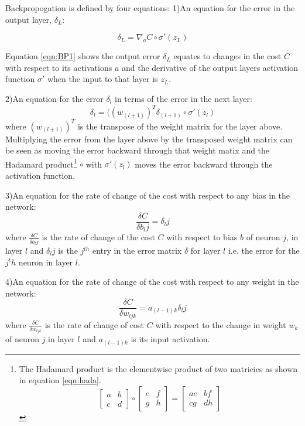 Backpropogation is defined by four equations:
1)An equation for the error in the output layer, $\delta_L$:

\begin{equation}
\delta_L = \nabla_a C \circ \sigma'(z_L)
\label{eqn:BP1}
\end{equation}

Equation \ref{eqn:BP1} shows the output error $\delta_L$ equates to changes in the cost $C$ with respect to its activations $a$ and the derivative of the output layers activation function $\sigma'$ when the input to that layer is $z_L$.

2)An equation for the error $\delta_l$ in terms of the error in the next layer:
\begin{equation}
\delta_l = ((w_{(l+1)})^T\delta_{(l+1)} \circ \sigma'(z_l)
\label{eqn:BP2}
\end{equation}
where $(w_{(l+1)})^T$ is the transpose of the weight matrix for the layer above. Multiplying the error from the layer above by the transposed weight matrix can be seen as moving the error backward through that weight matix and the Hadamard product\footnote{The Hadamard product is the elementwise product of two matricies as shown in equation \ref{eqn:hada}. \begin{equation}
\begin{bmatrix}
a & b \\
c & d
\end{bmatrix} \circ \begin{bmatrix}
e & f \\
g & h
\end{bmatrix} = \begin{bmatrix}
ae & bf \\
cg & dh
\end{bmatrix}
\label{eqn:hada}
\end{equation}} $\circ$ with $\sigma'(z_l)$ moves the error backward through the activation function.

3)An equation for the rate of change of the cost with respect to any bias in the network:
\begin{equation}
\frac{\delta C}{\delta b_lj} = \delta_lj
\label{eqn:BP3}
\end{equation}
where $\frac{\delta C}{\delta b_lj}$ is the rate of change of the cost $C$ with respect to bias $b$ of neuron $j$, in layer $l$ and $\delta_lj$ is the $j^{th}$ entry in the error matrix $\delta$ for layer $l$ i.e. the error for the $j^th$ neuron in layer $l$.

4)An equation for the rate of change of the cost with respect to any weight in the network:
\begin{equation}
\frac{\delta C}{\delta w_{ljk}} = a_{(l-1)k}\delta_lj
\label{eqn:BP4}
\end{equation}
where $\frac{\delta C}{\delta w_{ljk}}$ is the rate of change of cost $C$ with respect to the change in weight $w_k$ of neuron $j$ in layer $l$ and $a_{(l-1)k}$ is its input activation.

